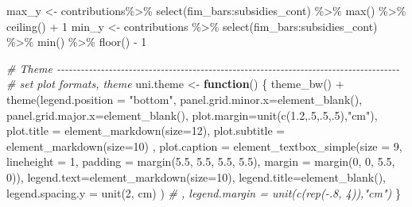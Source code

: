 \documentclass[
]{article}
\newenvironment{Shaded}{\begin{snugshade}}{\end{snugshade}}
\newcommand{\AttributeTok}[1]{\textcolor[rgb]{0.77,0.63,0.00}{#1}}
\newcommand{\CommentTok}[1]{\textcolor[rgb]{0.56,0.35,0.01}{\textit{#1}}}
\newcommand{\ControlFlowTok}[1]{\textcolor[rgb]{0.13,0.29,0.53}{\textbf{#1}}}
\newcommand{\DecValTok}[1]{\textcolor[rgb]{0.00,0.00,0.81}{#1}}
\newcommand{\FloatTok}[1]{\textcolor[rgb]{0.00,0.00,0.81}{#1}}
\newcommand{\FunctionTok}[1]{\textcolor[rgb]{0.00,0.00,0.00}{#1}}
\newcommand{\NormalTok}[1]{#1}
\newcommand{\OtherTok}[1]{\textcolor[rgb]{0.56,0.35,0.01}{#1}}
\newcommand{\SpecialCharTok}[1]{\textcolor[rgb]{0.00,0.00,0.00}{#1}}
\newcommand{\StringTok}[1]{\textcolor[rgb]{0.31,0.60,0.02}{#1}}
\begin{document}
\begin{Shaded}
\begin{Highlighting}[]
\NormalTok{max\_y }\OtherTok{\textless{}{-}}
\NormalTok{  contributions}\SpecialCharTok{\%\textgreater{}\%}
  \FunctionTok{select}\NormalTok{(fim\_bars}\SpecialCharTok{:}\NormalTok{subsidies\_cont) }\SpecialCharTok{\%\textgreater{}\%}
  \FunctionTok{max}\NormalTok{() }\SpecialCharTok{\%\textgreater{}\%}
  \FunctionTok{ceiling}\NormalTok{() }\SpecialCharTok{+} \DecValTok{1}
\NormalTok{min\_y }\OtherTok{\textless{}{-}}
\NormalTok{  contributions }\SpecialCharTok{\%\textgreater{}\%}
  \FunctionTok{select}\NormalTok{(fim\_bars}\SpecialCharTok{:}\NormalTok{subsidies\_cont) }\SpecialCharTok{\%\textgreater{}\%}
  \FunctionTok{min}\NormalTok{() }\SpecialCharTok{\%\textgreater{}\%}
  \FunctionTok{floor}\NormalTok{() }\SpecialCharTok{{-}} \DecValTok{1}

\CommentTok{\# Theme {-}{-}{-}{-}{-}{-}{-}{-}{-}{-}{-}{-}{-}{-}{-}{-}{-}{-}{-}{-}{-}{-}{-}{-}{-}{-}{-}{-}{-}{-}{-}{-}{-}{-}{-}{-}{-}{-}{-}{-}{-}{-}{-}{-}{-}{-}{-}{-}{-}{-}{-}{-}{-}{-}{-}{-}{-}{-}{-}{-}{-}{-}{-}{-}{-}{-}{-}{-}{-}{-}{-}{-}{-}{-}{-}{-}{-}{-}{-}{-}{-}{-}{-}{-}{-}{-}}
\CommentTok{\# set plot formats, theme }
\NormalTok{uni.theme }\OtherTok{\textless{}{-}} \ControlFlowTok{function}\NormalTok{() \{}
  \FunctionTok{theme\_bw}\NormalTok{() }\SpecialCharTok{+}
    \FunctionTok{theme}\NormalTok{(}\AttributeTok{legend.position =} \StringTok{"bottom"}\NormalTok{, }
          \AttributeTok{panel.grid.minor.x=}\FunctionTok{element\_blank}\NormalTok{(),}
          \AttributeTok{panel.grid.major.x=}\FunctionTok{element\_blank}\NormalTok{(),}
          \AttributeTok{plot.margin=}\FunctionTok{unit}\NormalTok{(}\FunctionTok{c}\NormalTok{(}\FloatTok{1.2}\NormalTok{,.}\DecValTok{5}\NormalTok{,.}\DecValTok{5}\NormalTok{,.}\DecValTok{5}\NormalTok{),}\StringTok{"cm"}\NormalTok{),}
          \AttributeTok{plot.title =} \FunctionTok{element\_markdown}\NormalTok{(}\AttributeTok{size=}\DecValTok{12}\NormalTok{),}
          \AttributeTok{plot.subtitle =} \FunctionTok{element\_markdown}\NormalTok{(}\AttributeTok{size=}\DecValTok{10}\NormalTok{) , }
          \AttributeTok{plot.caption =} 
            \FunctionTok{element\_textbox\_simple}\NormalTok{(}\AttributeTok{size =} \DecValTok{9}\NormalTok{,}
                                   \AttributeTok{lineheight =} \DecValTok{1}\NormalTok{,}
                                   \AttributeTok{padding =} \FunctionTok{margin}\NormalTok{(}\FloatTok{5.5}\NormalTok{, }\FloatTok{5.5}\NormalTok{, }\FloatTok{5.5}\NormalTok{, }\FloatTok{5.5}\NormalTok{),}
                                   \AttributeTok{margin =} \FunctionTok{margin}\NormalTok{(}\DecValTok{0}\NormalTok{, }\DecValTok{0}\NormalTok{, }\FloatTok{5.5}\NormalTok{, }\DecValTok{0}\NormalTok{)),}
          \AttributeTok{legend.text=}\FunctionTok{element\_markdown}\NormalTok{(}\AttributeTok{size=}\DecValTok{10}\NormalTok{), }
          \AttributeTok{legend.title=}\FunctionTok{element\_blank}\NormalTok{(),}
          \AttributeTok{legend.spacing.y =} \FunctionTok{unit}\NormalTok{(}\DecValTok{2}\NormalTok{, }\StringTok{\textquotesingle{}cm\textquotesingle{}}\NormalTok{)}
\NormalTok{    ) }\CommentTok{\# , legend.margin = unit(c(rep({-}.8, 4)),"cm")}
\NormalTok{\}}


\end{Highlighting}
\end{Shaded}
\end{document}
